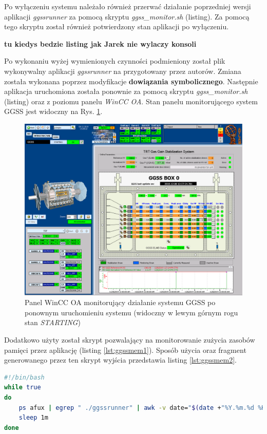 Po wyłączeniu systemu należało również przerwać działanie poprzedniej wersji aplikacji \textit{ggssrunner} za pomocą skryptu \textit{ggss\_monitor.sh} (listing). Za pomocą tego skryptu został również potwierdzony stan aplikacji po wyłączeniu.

\textbf{tu kiedys bedzie listing jak Jarek nie wylaczy konsoli}


Po wykonaniu wyżej wymienionych czynności podmieniony został plik wykonywalny aplikacji \textit{ggssrunner} na przygotowany przez autorów. Zmiana została wykonana poprzez modyfikacje \textbf{dowiązania symbolicznego}. Następnie aplikacja uruchomiona została ponownie za pomocą skryptu \textit{ggss\_monitor.sh} (listing) oraz z poziomu panelu \textit{WinCC OA}. Stan panelu monitorującego system GGSS jest widoczny na Rys. \ref{fig:ggssafterstart}.

\begin{figure}
\centering
\caption{Panel WinCC OA monitorujący działanie systemu GGSS po ponownym uruchomieniu systemu (widoczny w lewym górnym rogu stan \textit{STARTING})}
\label{fig:ggssafterstart}
\includegraphics[width=\textwidth]{res/png/ggssPoStarcie}
\end{figure}

Dodatkowo użyty został skrypt pozwalający na monitorowanie zużycia zasobów pamięci przez aplikację (listing \ref{lst:ggssmem1}). Sposób użycia oraz fragment generowanego przez ten skrypt wyjścia przedstawia listing \ref{lst:ggssmem2}. 

\begin{lstlisting}[language=bash, caption={Skrypt \textit{check\_mem\_ggssrunner.sh} służacy do monitorowania pamięci używanej przez aplikację \textit{ggssrunner}}, label={lst:ggssmem1}]
#!/bin/bash
while true
do
    ps afux | egrep " ./ggssrunner" | awk -v date="$(date +"%Y.%m.%d %H:%M:%S")" '{print date, $5}'
    sleep 1m
done
\end{lstlisting}


